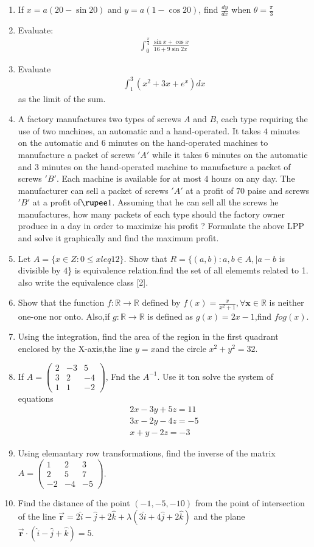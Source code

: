 \documentclass[10pt,-letter paper]{article}
\providecommand{\brak}[1]{\ensuremath{\left(#1\right)}}
\newcommand{\myvec}[1]{\ensuremath{\begin{pmatrix}#1\end{pmatrix}}}
\begin{document}
\begin{enumerate}
\item If $x=a\brak{20-\sin 20}$ and $y=a\brak{1-\cos 20}$, find $\frac{dy}{dx}$ when $\theta=\frac{\pi}{3}$
\item Evaluate: 
\begin{align*}
	\int_{0}^{\frac{\pi}{4}}\frac{\sin x+\cos x}{16+9 \sin 2x}
\end{align*}
\item Evaluate 
	\begin{align*}
		\int_{1}^{3} \brak{x^{2}+3x+e^{x}}dx
	\end{align*}
	as the limit of the sum.
\item A factory manufactures two types of screws $A$ and $B$, each type requiring the use of two machines, an automatic and a hand-operated. It takes $4$ minutes on the automatic and $6$ minutes on the hand-operated machines to manufacture a packet of screws $'A'$ while it takes $6$ minutes on the automatic and $3$ minutes on the hand-operated machine to manufacture a packet of screws $'B'$. Each machine is available for at most $4$ hours on any day. The manufacturer can sell a packet of screws $'A'$ at a profit of $70$ paise and screws $'B'$ at a profit of$\rupee 1$. Assuming that he can sell all the screws he manufactures, how many packets of each type should the factory owner produce in a day in order to maximize his profit ? Formulate the above LPP and solve it graphically and find the maximum profit.
\item Let $A=\{x \in Z : 0 \leq x leq 12\}$. Show that $R=\{\brak{a,b}: a,b \in A,\vert{a-b}$ is divisible by $4$\} is equivalence relation.find the set of all elememts related to 1. also write the equivalence class [2].
\item Show that the function $f:\mathbb{R}\rightarrow \mathbb{R}$ defined by $f\brak{x} = \frac{x}{x^{2}+1}, \forall \mathbf{x}\in \mathbb{R}$ is neither one-one nor onto. Also,if $g:\mathbb{R} \rightarrow \mathbb{R}$ is defined as $g\brak{x}=2x-1$,find $fog\brak{x}$.
\item Using the integration, find the area of the region in the first quadrant enclosed by the X-axis,the line $y=x$and the circle $x^{2}+y^{2}=32$.
\item If $A=\myvec{2 & -3 & 5 \\ 3 & 2 & -4 \\ 1 & 1 & -2}$, Fnd the $A^{-1}$. Use it ton solve the system of equations 
	\begin{align*}
		2x-3y+5z=11 \\
		3x-2y-4z=-5\\
		x+y-2z=-3
	\end{align*}
\item Using elemantary row transformations, find the inverse of the matrix $A=\myvec{1 & 2 & 3 \\ 2 & 5 & 7 \\ -2 & -4 & -5}$.
\item  Find the distance of the point \brak{-1,-5,-10} from the point of intersection of the line $\overrightarrow{\mathbf{r}}=2\hat{i}-\hat{j}+2\hat{k} + \lambda\brak{3\hat{i}+4\hat{j}+2\hat{k}}$ and the plane $\overrightarrow{\mathbf{r}}\cdot\brak{\hat{i}-\hat{j}+\hat{k}}=5$.
\end{enumerate}
\end{document}
